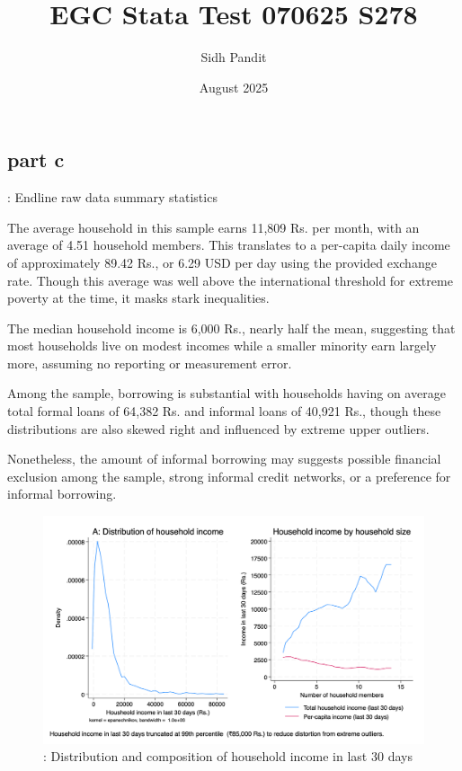 \documentclass[12pt]{article}
\title{EGC Stata Test 070625 S278}
\author{Sidh Pandit}
\date{August 2025}
\begin{document}
\maketitle


\subsection{part c}

\begin{table}[H]
    \centering
    \scriptsize %
    \setlength{\tabcolsep}{2pt}
    \renewcommand{\arraystretch}{2}
    \resizebox{\textwidth}{!}{}
    \caption{: Endline raw data summary statistics}
\end{table}

The average household in this sample earns 11,809 Rs. per month, with an average of 4.51 household members. This translates to a per-capita daily income of approximately 89.42 Rs., or 6.29 USD per day using the provided exchange rate. Though this average was well above the international threshold for extreme poverty at the time, it masks stark inequalities.

The median household income is 6,000 Rs., nearly half the mean, suggesting that most households live on modest incomes while a smaller minority earn largely more, assuming no reporting or measurement error.

Among the sample, borrowing is substantial with households having on average total formal loans of 64,382 Rs. and informal loans of 40,921 Rs., though these distributions are also skewed right and influenced by extreme upper outliers. 



Nonetheless, the amount of informal borrowing may suggests possible financial exclusion among the sample, strong informal credit networks, or a preference for informal borrowing.


\begin{figure}[H]
    \centering
    \includegraphics[width=\textwidth]{figures/figure01_hhinc.png}
    \caption{: Distribution and composition of household income in last 30 days}
\end{figure}
\end{document}
